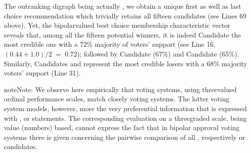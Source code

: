 \documentclass[a4paper,12pt,english]{sphinxhowto}
\begin{document}
\begin{sphinxVerbatim}[commandchars=\\\{\},numbers=left,firstnumber=1,stepnumber=1]
\PYG{g+go}{                           \PYGZsq{}a11\PYGZsq{}, \PYGZsq{}a12\PYGZsq{}, \PYGZsq{}a13\PYGZsq{}, \PYGZsq{}a14\PYGZsq{}, \PYGZsq{}a15\PYGZsq{}]}
\end{sphinxVerbatim}
\sphinxresetverbatimhllines

\sphinxAtStartPar
The outranking digraph  being actually , we obtain a unique  \textendash{}first as well as last\textendash{} choice recommendation which trivially retains all fifteen candidates (see Lines 6\sphinxhyphen{}9 above). Yet, the bipolar\sphinxhyphen{}valued best choice membership characteristic vector reveals that, among all the fifteen potential winners, it is indeed Candidate  the most credible one with a 72\% majority of voters’ support (see Line 16, \((0.44 + 1.0)/2\;=\; 0.72\)); followed by Candidate  (67\%) and Candidate  (65\%). Similarly, Candidates  and  represent the most credible losers with a 68\% majority voters’ support (Line 31).

\begin{sphinxadmonition}{note}{Note:}
\sphinxAtStartPar
We observe here empirically that  voting systems, using three\sphinxhyphen{}valued ordinal performance scales, match closely  voting systems. The latter voting system models, however, more  the very preferential information that is expressed with ,  or  statements. The corresponding evaluation on a three\sphinxhyphen{}graded scale, being value (numbers) based, cannot express the fact that in bipolar approval voting systems there is  given concerning the pairwise comparison of all , respectively  or  candidates.
\end{sphinxadmonition}
\end{document}
